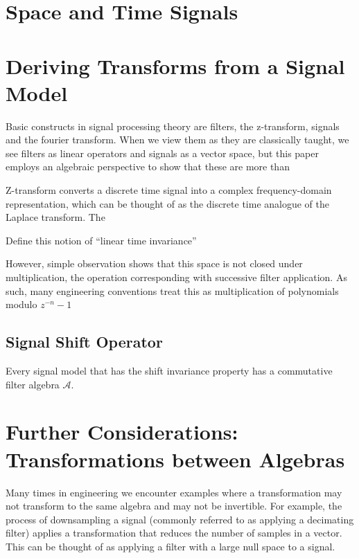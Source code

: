 \documentclass[12pt,technote]{IEEEtran}
\begin{document}
\section{Space and Time Signals}

\section{Deriving Transforms from a Signal Model}

\cite{AlgebraicSignalProcessing2006}
Basic constructs in signal processing theory are filters, the z-transform, signals and the fourier transform. When we view them as they are classically taught, we see filters as linear operators and signals as a vector space, but this paper employs an algebraic perspective to show that these are more than

Z-transform converts a discrete time signal  into a complex frequency-domain representation, which can be thought of as the discrete time analogue of the Laplace transform. The

Define this notion of ``linear time invariance''


However, simple observation shows that this space is not closed under multiplication, the operation corresponding with successive filter application. As such, many engineering conventions treat this as multiplication of polynomials modulo $z^{-n}-1$

\subsection{Signal Shift Operator}
Every signal model that has the shift invariance property has a commutative filter algebra $\mathcal{A}$.
\section{Further Considerations: Transformations between Algebras}
Many times in engineering we encounter examples where a transformation may not transform to the same algebra and may not be invertible. For example, the process of downsampling a signal (commonly referred to as applying a decimating filter) applies a transformation that reduces the number of samples in a vector. This can be thought of as applying a filter with a large null space to a signal.
\end{document}

